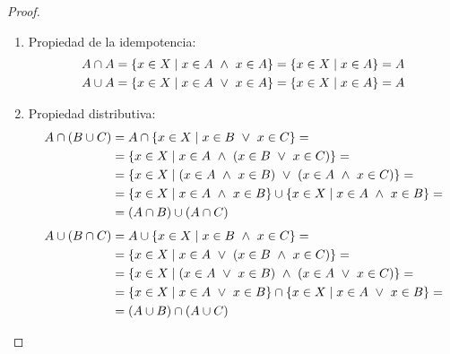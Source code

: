 \begin{proof}
\begin{enumerate}
        \item Propiedad de la idempotencia:
        \begin{gather*}
            A \cap A = \{x \in X \mid x \in A \ \land \  x \in A\} = \{x \in X \mid x \in A\} = A \\
            A \cup A = \{x \in X \mid x \in A \ \lor \  x \in A\} = \{x \in X \mid x \in A\} = A
        \end{gather*}
        \item Propiedad distributiva:
        \begin{equation*}
            \begin{split}
                A \cap (B \cup C) &= A \cap \{x \in X \mid x \in B \ \lor \  x \in C\} =\\
                & =\{x \in X \mid x \in A \ \land \  (x \in B \ \lor \  x \in C)\} =\\
                & =\{x \in X \mid (x \in A \ \land \  x \in B) \ \lor \  (x \in A \ \land \  x \in C)\} =\\
                & = \{x \in X \mid x \in A \ \land \  x \in B\} \cup \{x \in X \mid x \in A \ \land \  x \in B\} =\\
                & = (A \cap B) \cup (A \cap C)
            \end{split}
        \end{equation*}
        \begin{equation*}
            \begin{split}
                A \cup (B \cap C) &= A \cup \{x \in X \mid x \in B \ \land \  x \in C\} =\\
                & =\{x \in X \mid x \in A \ \lor \  (x \in B \ \land \  x \in C)\} =\\
                & =\{x \in X \mid (x \in A \ \lor \  x \in B) \ \land \  (x \in A \ \lor \  x \in C)\} =\\
                &= \{x \in X \mid x \in A \ \lor \  x \in B\} \cap \{x \in X \mid x \in A \ \lor \  x \in B\} =\\
                &= (A \cup B) \cap (A \cup C)
            \end{split}
        \end{equation*}
        \qedhere
    \end{enumerate}
\end{proof}

